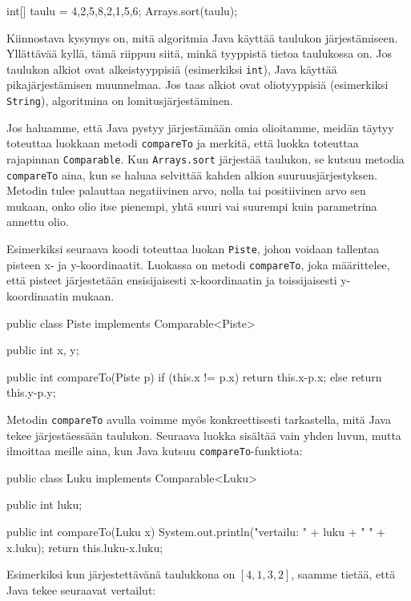 \begin{code}
int[] taulu = {4,2,5,8,2,1,5,6};
Arrays.sort(taulu);
\end{code}

Kiinnostava kysymys on, mitä algoritmia Java käyttää
taulukon järjes\-tämiseen.
Yllättävää kyllä, tämä riippuu siitä, minkä tyyppistä tietoa
taulukossa on.
Jos taulukon alkiot ovat alkeistyyppisiä
(esimerkiksi \texttt{int}), Java käyttää 
pikajärjestämisen muunnelmaa.
Jos taas alkiot ovat oliotyyppisiä
(esimerkiksi \texttt{String}),
algoritmina on lomitusjärjestäminen.

Jos haluamme, että Java pystyy järjestämään omia olioitamme,
meidän täytyy toteuttaa luokkaan metodi \texttt{compareTo} ja
merkitä, että luokka toteuttaa rajapinnan \texttt{Comparable}.
Kun \texttt{Arrays.sort} järjestää taulukon,
se kutsuu metodia \texttt{compareTo} aina, kun se haluaa selvittää
kahden alkion suuruusjärjestyksen.
Metodin tulee palauttaa negatiivinen arvo, nolla tai positiivinen arvo
sen mukaan, onko olio itse pienempi, yhtä suuri vai suurempi
kuin parametrina annettu olio.

Esimerkiksi seuraava koodi toteuttaa luokan \texttt{Piste},
johon voidaan tallentaa pisteen x- ja y-koordinaatit.
Luokassa on metodi \texttt{compareTo}, joka määrittelee,
että pisteet järjestetään ensisijaisesti x-koordinaatin ja
toissijaisesti y-koordinaatin mukaan.

\begin{code}
public class Piste implements Comparable<Piste> {
    public int x, y;

    public int compareTo(Piste p) {
        if (this.x != p.x) return this.x-p.x;
        else return this.y-p.y;
    }
}
\end{code}

Metodin \texttt{compareTo} avulla voimme myös konkreettisesti
tarkastella, mitä Java tekee järjestäessään taulukon.
Seuraava luokka sisältää vain yhden luvun,
mutta ilmoittaa meille aina, kun Java kutsuu
\texttt{compareTo}-funktiota:

\begin{code}
public class Luku implements Comparable<Luku> {
    public int luku;

    public int compareTo(Luku x) {
        System.out.println("vertailu: " + luku + " " + x.luku);
        return this.luku-x.luku;
    }
}
\end{code}

Esimerkiksi kun järjestettävänä taulukkona on $[4,1,3,2]$,
saamme tietää, että Java tekee seuraavat vertailut:

